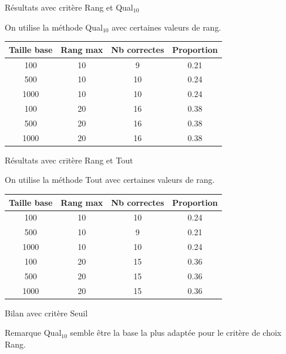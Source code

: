 \documentclass{beamer}
\begin{document}
\begin{frame}{Résultats avec critère Rang et Qual$_{10}$}

On utilise la méthode Qual$_{10}$ avec certaines valeurs de rang.
\begin{tabular}{|c|c|c|c|}
   \hline
   Taille base & Rang max & Nb correctes & Proportion\\
   \hline
   100 & 10  & 9 & 0.21  \\
   \hline
   500 & 10  & 10 & 0.24  \\
   \hline
   1000 & 10 & 10 & 0.24  \\
   \hline
   \hline
   100 & 20 & 16 & 0.38  \\
   \hline
   500 & 20 & 16 & 0.38  \\
   \hline
   1000 & 20 & 16 & 0.38  \\
   \hline
\end{tabular}
\end{frame}

\begin{frame}{Résultats avec critère Rang et Tout}

On utilise la méthode Tout avec certaines valeurs de rang.
\begin{tabular}{|c|c|c|c|}
   \hline
   Taille base & Rang max & Nb correctes & Proportion\\
   \hline
   100 & 10  & 10 & 0.24  \\
   \hline
   500 & 10  & 9 & 0.21  \\
   \hline
   1000 & 10 & 10 & 0.24  \\
   \hline
   \hline
   100 & 20 & 15 & 0.36  \\
   \hline
   500 & 20 & 15 & 0.36  \\
   \hline
   1000 & 20 & 15 & 0.36  \\
   \hline
\end{tabular}
\end{frame}
\begin{frame}{Bilan avec critère Seuil}
\begin{exampleblock}{Remarque}
Qual$_{10}$ semble être la base la plus adaptée pour le critère de choix Rang.
\end{exampleblock}
\end{frame}
\end{document}
